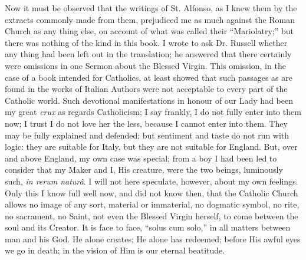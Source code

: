 Now it must be observed that the writings of St. Alfonso, as I knew
them by the extracts commonly made from them, prejudiced me as much
against the Roman Church as any thing else, on account of what was
called their ``Mariolatry;'' but there was nothing of the kind
in this book. I wrote to ask Dr. Russell whether any thing had been left
out in the translation; he answered that there certainly were omissions
in one Sermon about the Blessed Virgin. This omission, in the
case of a book intended for Catholics, at least showed that such
passages as are found in the works of Italian Authors were not
acceptable to every part of the Catholic world. Such devotional
manifestations in honour of our Lady had been my great \emph{crux} as
regards Catholicism; I say frankly, I do not fully enter into them
now; I trust I do not love her the less, because I cannot enter into
them. They may be fully explained and defended; but sentiment and taste
do not run with logic: they are suitable for Italy, but they are not
suitable for England. But, over and above England, my own case was
special; from a boy I had been led to consider that my Maker and I, His
creature, were the two beings, luminously such, \emph{in rerum
naturâ}. I will not here speculate, however, about my own feelings.
Only this I know full well now, and did not know then, that the Catholic
Church allows no image of any sort, material or immaterial, no dogmatic
symbol, no rite, no sacrament, no Saint, not even the Blessed Virgin
herself, to come between the soul and its Creator. It is face to face,
``solus cum solo,'' in all matters between man and his God. He
alone creates; He alone has redeemed; before His awful eyes we go in
death; in the vision of Him is our eternal beatitude.

